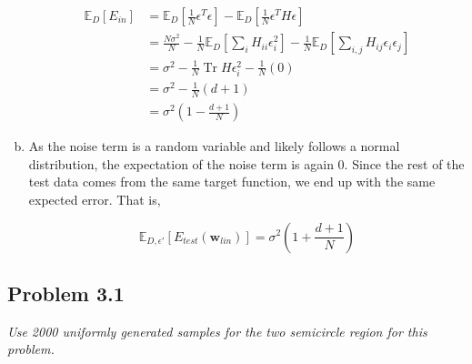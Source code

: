 \documentclass{article}
\renewcommand{\vec}[1]{\mathbf{#1}}
\DeclareMathOperator{\Tr}{Tr}
\begin{document}
\begin{enumerate}[(a)]
    \begin{align*}
      \mathbb{E}_D[E_{in}] &= \mathbb{E}_D[\frac{1}{N}\epsilon^T\epsilon] - 
          \mathbb{E}_D[\frac{1}{N}\epsilon^TH\epsilon] \\
      &= \frac{N\sigma^2}{N} - \frac{1}{N}\mathbb{E}_D[\sum_iH_{ii}\epsilon_i^2]
          - \frac{1}{N}\mathbb{E}_D[\sum_{i,j}H_{ij}\epsilon_i\epsilon_j] \\
      &= \sigma^2 - \frac{1}{N}\Tr{H}\epsilon_i^2 - \frac{1}{N}(0) \\
      &= \sigma^2 - \frac{1}{N}(d+1) \\
      &= \sigma^2(1 - \frac{d+1}{N})
    \end{align*}


  \item

    As the noise term is a random variable and likely follows a normal distribution, the 
    expectation of the noise term is again 0. Since the rest of the test data comes from the
    same target function, we end up with the same expected error. That is,

    $$\mathbb{E}_{D,\epsilon'}[E_{test}(\vec{w}_{lin})] = \sigma^2(1 + \frac{d+1}{N})$$

\end{enumerate}



\subsection*{Problem 3.1}

\textit{Use 2000 uniformly generated samples for the two semicircle region for this problem.}
\end{document}
